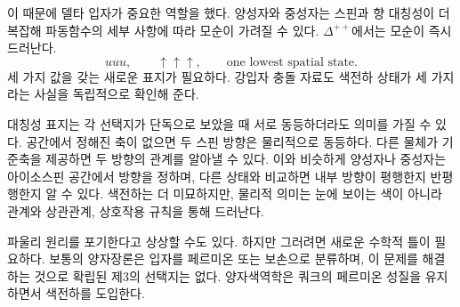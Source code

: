\begin{classroomqa}
\end{classroomqa}


\begin{classroomqa}
\end{classroomqa}

이 때문에 델타 입자가 중요한 역할을 했다. 양성자와 중성자는 스핀과 향 대칭성이 더 복잡해 파동함수의 세부 사항에 따라 모순이 가려질 수 있다. \(\Delta^{++}\)에서는 모순이 즉시 드러난다.
\begin{equation}
uuu,\qquad
\uparrow\uparrow\uparrow,
\qquad
\text{one lowest spatial state}.
\end{equation}
세 가지 값을 갖는 새로운 표지가 필요하다. 강입자 충돌 자료도 색전하 상태가 세 가지라는 사실을 독립적으로 확인해 준다.

대칭성 표지는 각 선택지가 단독으로 보았을 때 서로 동등하더라도 의미를 가질 수 있다. 공간에서 정해진 축이 없으면 두 스핀 방향은 물리적으로 동등하다. 다른 물체가 기준축을 제공하면 두 방향의 관계를 알아낼 수 있다. 이와 비슷하게 양성자나 중성자는 아이소스핀 공간에서 방향을 정하며, 다른 상태와 비교하면 내부 방향이 평행한지 반평행한지 알 수 있다. 색전하는 더 미묘하지만, 물리적 의미는 눈에 보이는 색이 아니라 관계와 상관관계, 상호작용 규칙을 통해 드러난다.

파울리 원리를 포기한다고 상상할 수도 있다. 하지만 그러려면 새로운 수학적 틀이 필요하다. 보통의 양자장론은 입자를 페르미온 또는 보손으로 분류하며, 이 문제를 해결하는 것으로 확립된 제3의 선택지는 없다. 양자색역학은 쿼크의 페르미온 성질을 유지하면서 색전하를 도입한다.

\begin{classroomqa}
\end{classroomqa}

